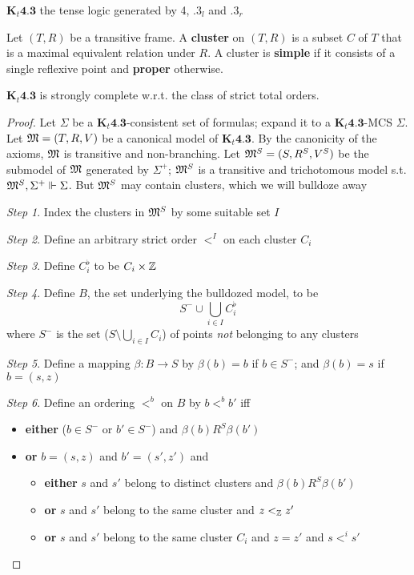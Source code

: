 \documentclass[11pt]{article}
\begin{document}
\(\textbf{K}_t\textbf{4.3}\) the tense logic generated by 4, \(.3_l\) and \(.3_r\)

\begin{definition}[]
Let \((T,R)\) be a transitive frame. A \textbf{cluster} on \((T,R)\) is a subset \(C\)
of \(T\) that is a maximal equivalent relation under \(R\). A cluster is
\textbf{simple} if it consists of a single reflexive point and \textbf{proper} otherwise.
\end{definition}

\begin{theorem}[]
\(\textbf{K}_t\textbf{4.3}\) is strongly complete w.r.t. the class of strict
total orders.
\end{theorem}

\begin{proof}
Let \(\Sigma\) be a \(\textbf{K}_t\textbf{4.3}\)-consistent set of formulas; expand it
to a \(\textbf{K}_t\textbf{4.3}\)-MCS \(\Sigma\). Let \(\mathfrak{M}=(T,R,V)\) be a canonical
model of \(\textbf{K}_t\textbf{4.3}\). By the canonicity of the axioms,
\(\mathfrak{M}\) is transitive and non-branching. Let \(\mathfrak{M}^S=(S,R^S,V^S)\) be the
submodel of \(\mathfrak{M}\) generated by \(\Sigma^+\); \(\mathfrak{M}^S\) is a transitive and
trichotomous model s.t. \(\mathfrak{M}^S,\Sigma^+\Vdash\Sigma\). But \(\mathfrak{M}^S\) may contain
clusters, which we will bulldoze away

\emph{Step 1}. Index the clusters in \(\mathfrak{M}^S\) by some suitable set \(I\)

\emph{Step 2}. Define an arbitrary strict order \(<^I\) on each cluster \(C_i\)

\emph{Step 3}. Define \(C^\flat_i\) to be \(C_i\times\mathbb{Z}\)

\emph{Step 4}. Define \(B\), the set underlying the bulldozed model, to be
\begin{equation*}
S^-\cup\bigcup_{i\in I}C_i^\flat
\end{equation*}
where \(S^-\) is the set (\(S\setminus\bigcup_{i\in I}C_i\)) of points \emph{not}
belonging to any clusters

\emph{Step 5}. Define a mapping \(\beta:B\to S\) by \(\beta(b)=b\) if \(b\in S^-\); and
\(\beta(b)=s\) if \(b=(s,z)\)

\emph{Step 6}. Define an ordering \(<^b\) on \(B\) by \(b<^b b'\) iff
\begin{itemize}
\item \textbf{either} (\(b\in S^-\) or \(b'\in S^-\)) and \(\beta(b)R^S\beta(b')\)
\item \textbf{or} \(b=(s,z)\) and \(b'=(s',z')\) and
\begin{itemize}
\item \textbf{either} \(s\) and \(s'\) belong to distinct clusters and \(\beta(b)R^S\beta(b')\)
\item \textbf{or} \(s\) and \(s'\) belong to the same cluster and \(z<_{\mathbb{Z}} z'\)
\item \textbf{or} \(s\) and \(s'\) belong to the same cluster \(C_i\) and \(z=z'\) and
\(s<^i s'\)
\end{itemize}
\end{itemize}



\end{proof}
\end{document}
